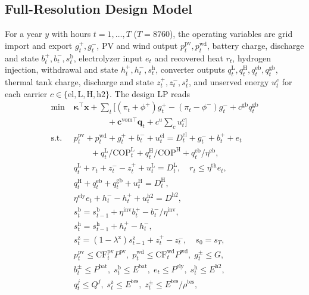 \documentclass[journal]{IEEEtran}
\begin{document}
\subsection{Full-Resolution Design Model}
For a year $y$ with hours $t=1,\dots,T$ ($T=8760$), the operating variables are grid import and export $g^{+}_t,g^{-}_t$, PV and wind output $p^{\mathrm{pv}}_t,p^{\mathrm{wd}}_t$, battery charge, discharge and state $b^{+}_t,b^{-}_t,s^{\mathrm{b}}_t$, electrolyzer input $e_t$ and recovered heat $r_t$, hydrogen injection, withdrawal and state $h^{+}_t,h^{-}_t,s^{\mathrm{h}}_t$, converter outputs $q^{\mathrm{L}}_t,q^{\mathrm{H}}_t,q^{\mathrm{eb}}_t,q^{\mathrm{gb}}_t$, thermal tank charge, discharge and state $z^{+}_t,z^{-}_t,s^{\mathrm{z}}_t$, and unserved energy $u^{c}_t$ for each carrier $c\in\{\mathrm{el},\mathrm{L},\mathrm{H},\mathrm{h2}\}$. The design LP reads
\begin{align}
\min\;& \bm{\kappa}^{\top}\bm{x}+\sum_{t}\Big[(\pi_t+\phi^{+})g^{+}_t-(\pi_t-\phi^{-})g^{-}_t+c^{\mathrm{gb}}q^{\mathrm{gb}}_t \nonumber\\
&\qquad\qquad +\bm{c}^{\mathrm{vom}\top}\bm{q}_t+c^{u}\textstyle\sum_{c}u^{c}_t\Big] \label{eq:obj}\\
\text{s.t. }& p^{\mathrm{pv}}_t+p^{\mathrm{wd}}_t+g^{+}_t+b^{-}_t+u^{\mathrm{el}}_t = D^{\mathrm{el}}_t+g^{-}_t+b^{+}_t+e_t \nonumber\\
&\qquad +q^{\mathrm{L}}_t/\mathrm{COP}^{\mathrm{L}}_t+q^{\mathrm{H}}_t/\mathrm{COP}^{\mathrm{H}}+q^{\mathrm{eb}}_t/\eta^{\mathrm{eb}}, \label{eq:el}\\
& q^{\mathrm{L}}_t+r_t+z^{-}_t-z^{+}_t+u^{\mathrm{L}}_t=D^{\mathrm{L}}_t,\quad r_t\le\eta^{\mathrm{th}}e_t, \label{eq:lt}\\
& q^{\mathrm{H}}_t+q^{\mathrm{eb}}_t+q^{\mathrm{gb}}_t+u^{\mathrm{H}}_t=D^{\mathrm{H}}_t, \label{eq:ht}\\
& \eta^{\mathrm{ely}}e_t+h^{-}_t-h^{+}_t+u^{\mathrm{h2}}_t=D^{\mathrm{h2}}, \label{eq:h2}\\
& s^{\mathrm{b}}_t=s^{\mathrm{b}}_{t-1}+\eta^{\mathrm{inv}}b^{+}_t-b^{-}_t/\eta^{\mathrm{inv}}, \nonumber\\
& s^{\mathrm{h}}_t=s^{\mathrm{h}}_{t-1}+h^{+}_t-h^{-}_t, \nonumber\\
& s^{\mathrm{z}}_t=(1-\lambda^{\mathrm{z}})s^{\mathrm{z}}_{t-1}+z^{+}_t-z^{-}_t,\quad s_0=s_T, \label{eq:soc}\\
& p^{\mathrm{pv}}_t\le \mathrm{CF}^{\mathrm{pv}}_tP^{\mathrm{pv}},\; p^{\mathrm{wd}}_t\le \mathrm{CF}^{\mathrm{wd}}_tP^{\mathrm{wd}},\; g^{\pm}_t\le G, \nonumber\\
& b^{\pm}_t\le P^{\mathrm{bat}},\; s^{\mathrm{b}}_t\le E^{\mathrm{bat}},\; e_t\le P^{\mathrm{ely}},\; s^{\mathrm{h}}_t\le E^{\mathrm{h2}}, \nonumber\\
& q^{j}_t\le Q^{j},\; s^{\mathrm{z}}_t\le E^{\mathrm{tes}},\; z^{\pm}_t\le E^{\mathrm{tes}}/\rho^{\mathrm{tes}}, \label{eq:cap}
\end{align}
\end{document}
